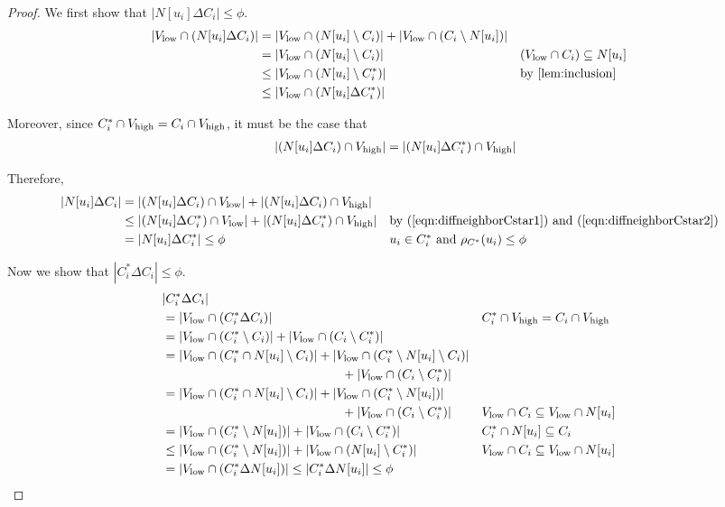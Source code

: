 \begin{proof}
We first show that $|N[u_i] \Delta C_i| \leq \phi$.
\begin{align}
|\Vlow \cap (N[u_i] \Delta C_i)| &= |\Vlow \cap (N[u_i] \setminus C_i)| + |\Vlow \cap (C_i \setminus N[u_i])| \nonumber \\
&= |\Vlow \cap (N[u_i] \setminus C_i)|  && (\Vlow \cap C_i) \subseteq N[u_i]  \nonumber  \\
&\leq |\Vlow \cap (N[u_i] \setminus C^{*}_i)|  && \mbox{by \Cref{lem:inclusion}}   \nonumber \\
&\leq |\Vlow \cap (N[u_i] \Delta C^{*}_i)|  \label{eqn:diffneighborCstar1}
\end{align}

Moreover, since $C^{*}_i \cap V_{\operatorname{high}} = C_i \cap V_{\operatorname{high}}$, it must be the case that 
\begin{align}
|(N[u_i] \Delta C_i) \cap V_{\operatorname{high}}| = |(N[u_i] \Delta C^{*}_i) \cap V_{\operatorname{high}}|  \label{eqn:diffneighborCstar2}
\end{align}

Therefore,
\begin{align*}
|N[u_i] \Delta C_i| &= |(N[u_i] \Delta C_i) \cap V_{\operatorname{low}}| + |(N[u_i] \Delta C_i) \cap V_{\operatorname{high}}| \\
&\leq |(N[u_i] \Delta C^{*}_i) \cap V_{\operatorname{low}}| + |(N[u_i] \Delta C^{*}_i) \cap V_{\operatorname{high}}| && \mbox{by (\ref{eqn:diffneighborCstar1}) and (\ref{eqn:diffneighborCstar2})} \\
& = |N[u_i] \Delta C^{*}_i| \leq \phi  && \mbox{$u_i \in C^{*}_i$ and $\rho_{C^{*}}(u_i) \leq \phi$}
\end{align*}

Now we show that $|C^{*}_i \Delta C_{i}| \leq \phi$. 
\begin{align*}
&|C^{*}_i \Delta C_{i}| \\
&= |\Vlow \cap (C^{*}_i \Delta C_{i})| && C^{*}_i \cap \Vhigh = C_i \cap \Vhigh \\
&= |\Vlow \cap (C^{*}_i \setminus C_{i})| + |\Vlow \cap (C_i \setminus C^{*}_{i})| \\
&= |\Vlow \cap (C^{*}_i\cap N[u_i] \setminus C_{i})| + |\Vlow \cap (C^{*}_i \setminus N[u_i] \setminus C_{i})| \\
& \hspace{50mm} + |\Vlow \cap (C_i \setminus C^{*}_{i})| \\
&= |\Vlow \cap (C^{*}_i\cap N[u_i] \setminus C_{i})| + |\Vlow \cap (C^{*}_i \setminus N[u_i])| \\
& \hspace{50mm} + |\Vlow \cap (C_i \setminus C^{*}_{i})| && \Vlow \cap C_i \subseteq \Vlow \cap N[u_i]\\
&= |\Vlow \cap (C^{*}_i \setminus N[u_i])| + |\Vlow \cap (C_i \setminus C^{*}_{i})| && C^{*}_i\cap N[u_i] \subseteq C_i \\
&\leq |\Vlow \cap (C^{*}_i \setminus N[u_i])| + |\Vlow \cap (N[u_i] \setminus C^{*}_{i})| && \Vlow \cap C_i \subseteq \Vlow \cap N[u_i] \\
&= |\Vlow \cap (C^{*}_i \Delta N[u_i])| \leq |C^{*}_i \Delta N[u_i]| \leq \phi
\end{align*}

\end{proof}

